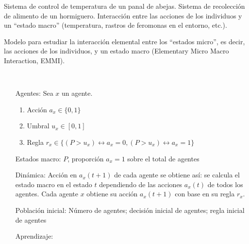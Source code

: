 \documentclass{article}
\begin{document}
Sistema de control de temperatura de un panal de abejas. Sistema de recolección de alimento de un hormiguero. Interacción entre las acciones de los individuos y un ``estado macro'' (temperatura, rastros de feromonas en el entorno, etc.). 

Modelo para estudiar la interacción elemental entre los ``estados micro'', es decir, las acciones de los individuos, y un estado macro (Elementary Micro Macro Interaction, EMMI). 

\

\begin{itemize}
\item[Agentes:] Sea $x$ un agente.

	\begin{enumerate}
	\item Acción $a_x\in\{0, 1\}$
	\item Umbral $u_x\in[0,1]$
	\item Regla $r_x\in\{(P>u_x)\leftrightarrow a_x=0, (P> u_x)\leftrightarrow a_x=1\}$
	\end{enumerate}

\item[Estados macro:] $P$, proporción $a_x=1$ sobre el total de agentes

\item[Dinámica:] Acción en $a_x(t+1)$ de cada agente se obtiene así: se calcula el estado macro  en el estado $t$ dependiendo de las acciones $a_x(t)$ de todos los agentes. Cada agente $x$ obtiene su acción $a_x(t+1)$ con base en su regla $r_x$.

\item[Población inicial:] Número de agentes; decisión inicial de agentes; regla inicial de agentes

\item[Aprendizaje:] 

\end{itemize}
\end{document}
